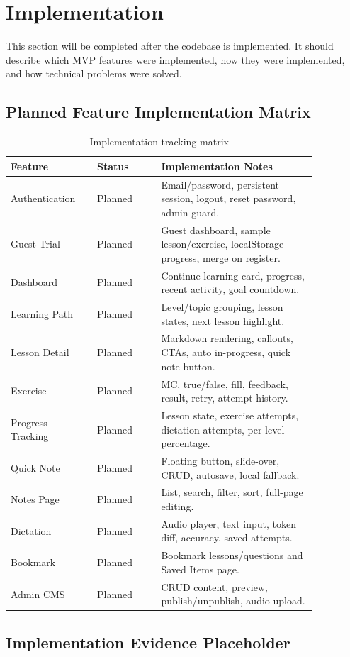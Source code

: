 \section{Implementation}

This section will be completed after the codebase is implemented. It should describe which MVP features were implemented, how they were implemented, and how technical problems were solved.

\subsection{Planned Feature Implementation Matrix}

\begin{longtable}{p{0.24\linewidth} p{0.18\linewidth} p{0.44\linewidth}}
\caption{Implementation tracking matrix}\\
\toprule
Feature & Status & Implementation Notes \\
\midrule
\endhead
Authentication & Planned & Email/password, persistent session, logout, reset password, admin guard. \\
Guest Trial & Planned & Guest dashboard, sample lesson/exercise, localStorage progress, merge on register. \\
Dashboard & Planned & Continue learning card, progress, recent activity, goal countdown. \\
Learning Path & Planned & Level/topic grouping, lesson states, next lesson highlight. \\
Lesson Detail & Planned & Markdown rendering, callouts, CTAs, auto in-progress, quick note button. \\
Exercise & Planned & MC, true/false, fill, feedback, result, retry, attempt history. \\
Progress Tracking & Planned & Lesson state, exercise attempts, dictation attempts, per-level percentage. \\
Quick Note & Planned & Floating button, slide-over, CRUD, autosave, local fallback. \\
Notes Page & Planned & List, search, filter, sort, full-page editing. \\
Dictation & Planned & Audio player, text input, token diff, accuracy, saved attempts. \\
Bookmark & Planned & Bookmark lessons/questions and Saved Items page. \\
Admin CMS & Planned & CRUD content, preview, publish/unpublish, audio upload. \\
\bottomrule
\end{longtable}

\subsection{Implementation Evidence Placeholder}


